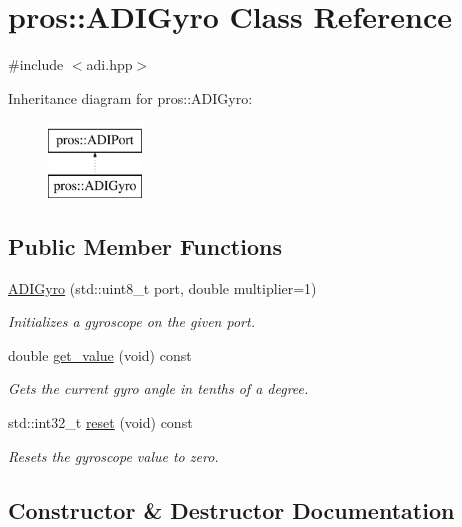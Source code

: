 \hypertarget{classpros_1_1ADIGyro}{}\section{pros\+:\+:A\+D\+I\+Gyro Class Reference}
\label{classpros_1_1ADIGyro}


{\ttfamily \#include $<$adi.\+hpp$>$}

Inheritance diagram for pros\+:\+:A\+D\+I\+Gyro\+:\begin{figure}[H]
\begin{center}
\leavevmode
\includegraphics[height=2.000000cm]{classpros_1_1ADIGyro}
\end{center}
\end{figure}
\subsection*{Public Member Functions}
\begin{DoxyCompactItemize}
\item 
\hyperlink{classpros_1_1ADIGyro_adc826b3bcb88213a0df283178279662a}{A\+D\+I\+Gyro} (std\+::uint8\+\_\+t port, double multiplier=1)
\begin{DoxyCompactList}\small\item\em Initializes a gyroscope on the given port. \end{DoxyCompactList}\item 
double \hyperlink{classpros_1_1ADIGyro_a829f933aaaa370483c36aba9f4a4f09c}{get\+\_\+value} (void) const
\begin{DoxyCompactList}\small\item\em Gets the current gyro angle in tenths of a degree. \end{DoxyCompactList}\item 
std\+::int32\+\_\+t \hyperlink{classpros_1_1ADIGyro_a3e2df8c21f4eb0bfa3559834221195fe}{reset} (void) const
\begin{DoxyCompactList}\small\item\em Resets the gyroscope value to zero. \end{DoxyCompactList}\end{DoxyCompactItemize}


\subsection{Constructor \& Destructor Documentation}
\mbox{\label{classpros_1_1ADIGyro_adc826b3bcb88213a0df283178279662a}} 
